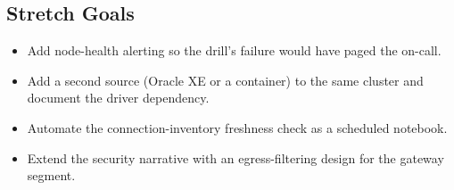 \subsection*{Stretch Goals}
\begin{itemize}
    \item Add node-health alerting so the drill's failure would have paged the on-call.
    \item Add a second source (Oracle XE or a container) to the same cluster and document the driver dependency.
    \item Automate the connection-inventory freshness check as a scheduled notebook.
    \item Extend the security narrative with an egress-filtering design for the gateway segment.
\end{itemize}
